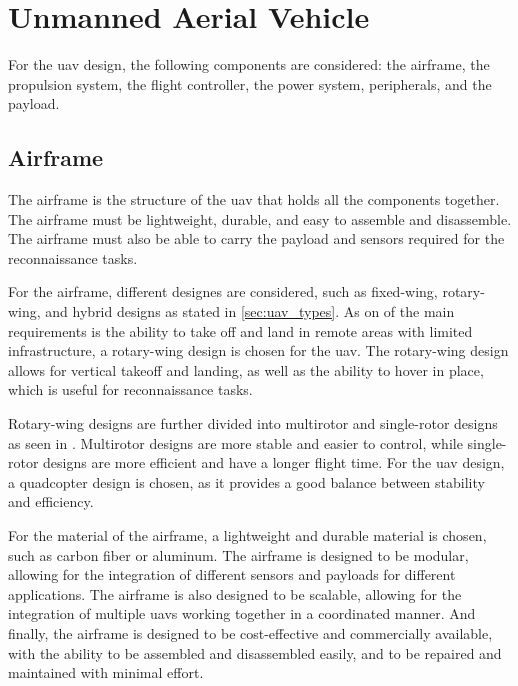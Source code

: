 \section{Unmanned Aerial Vehicle}\label{sec:uav}

For the \gls{uav} design, the following components are considered: the airframe, the propulsion system, the flight controller, the power system, peripherals, and the payload.

\subsection{Airframe}

The airframe is the structure of the \gls{uav} that holds all the components together. The airframe must be lightweight, durable, and easy to assemble and disassemble. The airframe must also be able to carry the payload and sensors required for the reconnaissance tasks.

For the airframe, different designes are considered, such as fixed-wing, rotary-wing, and hybrid designs as stated in \cref{sec:uav_types}. As on of the main requirements is the ability to take off and land in remote areas with limited infrastructure, a rotary-wing design is chosen for the \gls{uav}. The rotary-wing design allows for vertical takeoff and landing, as well as the ability to hover in place, which is useful for reconnaissance tasks.

Rotary-wing designs are further divided into multirotor and single-rotor designs as seen in . Multirotor designs are more stable and easier to control, while single-rotor designs are more efficient and have a longer flight time. For the \gls{uav} design, a quadcopter design is chosen, as it provides a good balance between stability and efficiency.


For the material of the airframe, a lightweight and durable material is chosen, such as carbon fiber or aluminum. The airframe is designed to be modular, allowing for the integration of different sensors and payloads for different applications. The airframe is also designed to be scalable, allowing for the integration of multiple \glspl{uav} working together in a coordinated manner. And finally, the airframe is designed to be cost-effective and commercially available, with the ability to be assembled and disassembled easily, and to be repaired and maintained with minimal effort.


